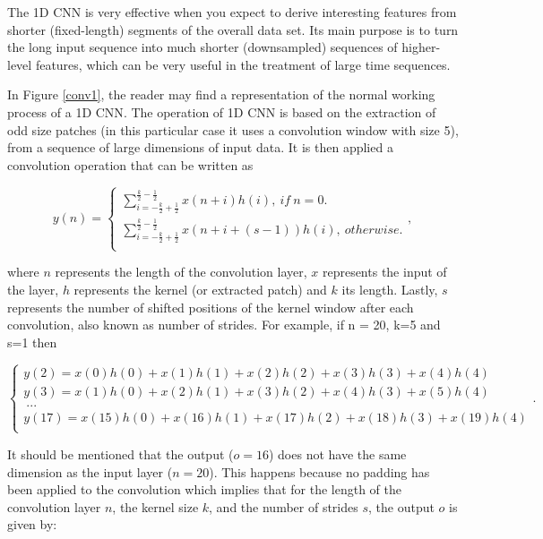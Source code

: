 The \ac{1D CNN} is very effective when you expect to derive interesting features from shorter (fixed-length) segments of the overall data set. Its main purpose is to turn the long input sequence into much shorter (downsampled) sequences of higher-level features, which can be very useful in the treatment of large time sequences.

In Figure \ref{conv1}, the reader may find a representation of the normal working process of a \ac{1D CNN}. The operation of \ac{1D CNN} is based on the extraction of odd size patches (in this particular case it uses a convolution window with size 5), from a sequence of large dimensions of input data. It is then applied a convolution operation that can be written as \cite{cnn2} 

\begin{equation}
y(n)=
    \begin{cases} 
            
        \sum_{i=-\frac{k}{2}+\frac{1}{2}}^{\frac{k}{2}-\frac{1}{2}} x(n+i)h(i),\  if \  n=0.\\
        \sum_{i=-\frac{k}{2}+\frac{1}{2}}^{\frac{k}{2}-\frac{1}{2}} x(n+i+(s-1))h(i),\  otherwise.\\
    
    \end{cases} ,
\end{equation}

where $n$ represents the length of the convolution layer, $x$ represents the input of the layer, $h$ represents the kernel (or extracted patch) and $k$ its length. Lastly, $s$ represents the number of shifted positions of the kernel window after each convolution, also known as number of strides. For example, if n = 20, k=5 and s=1 then

\begin{equation}
    \begin{cases} 
        y(2)=x(0)h(0)+x(1)h(1)+x(2)h(2)+x(3)h(3)+x(4)h(4)\\
        y(3)=x(1)h(0)+x(2)h(1)+x(3)h(2)+x(4)h(3)+x(5)h(4)\\
        \  ...\\
        y(17)=x(15)h(0)+x(16)h(1)+x(17)h(2)+x(18)h(3)+x(19)h(4)\\
    \end{cases} .
    \label{noncausal}
\end{equation}

It should be mentioned that the output ($o=16$) does not have the same dimension as the input layer ($n=20$). This happens because no padding has been applied to the convolution which implies that for the length of the convolution layer $n$, the kernel size $k$, and the number of strides $s$, the output $o$ is given by:

